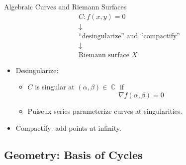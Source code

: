 \documentclass{beamer}
\DeclareMathOperator{\CC}{\mathbb{C}}
\begin{document}
\begin{frame}{Algebraic Curves and Riemann Surfaces}{}
  \begin{gather*}
    C : f(x,y) = 0 \\
    \downarrow     \\
    \text{``desingularize'' and ``compactify''} \\
    \downarrow     \\
    \text{Riemann surface } X
  \end{gather*}

  \begin{itemize}
    \item Desingularize:
      \begin{itemize}
        \item $C$ is singular at $(\alpha,\beta) \in \CC$ if
          \[
          \nabla f (\alpha, \beta) = 0
          \]
        \item Puiseux series parameterize curves at singularities.
      \end{itemize}
    \item Compactify: add points at infinity. %
  \end{itemize}
\end{frame}






\subsection{Geometry: Basis of Cycles}
\end{document}
